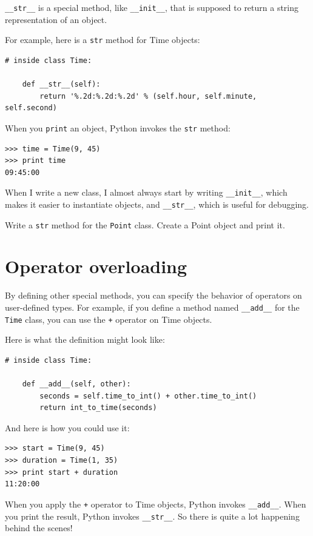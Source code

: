 \documentclass[10pt]{book}
\begin{document}
\begin{CJK}{UTF8}{gbsn}
\verb"__str__" is a special method, like \verb"__init__",
that is supposed to return a string representation of an object.

For example, here is a {\tt str} method for Time objects:

\begin{verbatim}
# inside class Time:

    def __str__(self):
        return '%.2d:%.2d:%.2d' % (self.hour, self.minute, self.second)
\end{verbatim}
%
When you {\tt print} an object, Python invokes the {\tt str} method:

\begin{verbatim}
>>> time = Time(9, 45)
>>> print time
09:45:00
\end{verbatim}
%
When I write a new class, I almost always start by writing 
\verb"__init__", which makes it easier to instantiate objects, and 
\verb"__str__", which is useful for debugging.


\begin{exercise}

Write a {\tt str} method for the {\tt Point} class.  Create
a Point object and print it.

\end{exercise}


\section{Operator overloading}
\label{operator.overloading}

By defining other special methods, you can specify the behavior
of operators on user-defined types.  For example, if you define
a method named \verb"__add__" for the {\tt Time} class, you can use the
{\tt +} operator on Time objects.

Here is what the definition might look like:

\begin{verbatim}
# inside class Time:

    def __add__(self, other):
        seconds = self.time_to_int() + other.time_to_int()
        return int_to_time(seconds)
\end{verbatim}
%
And here is how you could use it:

\begin{verbatim}
>>> start = Time(9, 45)
>>> duration = Time(1, 35)
>>> print start + duration
11:20:00
\end{verbatim}
%
When you apply the {\tt +} operator to Time objects, Python invokes
\verb"__add__".  When you print the result, Python invokes 
\verb"__str__".  So there is quite a lot happening behind the scenes!


\end{CJK}
\end{document}
